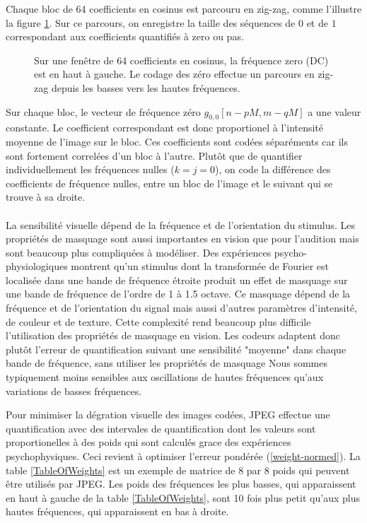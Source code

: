 Chaque bloc de 64 coefficients en cosinus est parcouru en
zig-zag, comme l'illustre la figure \ref{JPEG-zigzag}.
Sur ce parcours, on enregistre la taille des s\'equences
de $0$ et de $1$ correspondant aux coefficients quantifi\'es
\`a zero ou pas.

\begin{figure}[bhtp]
\centerline{
        \epsfxsize=5cm
	\leavevmode{}}
\caption{Sur une fen\^etre de 64 coefficients en cosinus, la
fr\'equence zero (DC) est en haut \`a gauche. Le codage des
z\'ero effectue un parcours en
zig-zag depuis les basses vers les hautes fr\'equences.}
\label{JPEG-zigzag}
\end{figure}

Sur chaque bloc,
le vecteur de fr\'equence
z\'ero $g_{0,0} [n-pM,m-qM]$ a une valeur constante.
Le coefficient correspondant est donc proportionel \`a
l'intensit\'e moyenne de l'image sur le bloc.
Ces coefficients sont cod\'ees s\'epar\'ements car
ils sont fortement
correl\'ees d'un bloc \`a l'autre. Plut\^ot que de quantifier
individuellement les
fr\'equences nulles ($k=j=0$), on code
la diff\'erence des coefficients de fr\'equence nulles,
entre un bloc de l'image
et le suivant qui se trouve \`a sa droite.
\\
\\
La sensibilit\'e visuelle d\'epend de la fr\'equence
et de l'orientation
du stimulus.
Les propri\'et\'es de masquage sont aussi importantes en vision
que pour l'audition mais sont beaucoup plus compliqu\'ees \`a mod\'eliser.
Des exp\'eriences psycho-physiologiques montrent qu'un stimulus
dont la transform\'ee de Fourier est localis\'ee dans une bande
de fr\'equence \'etroite produit un effet de masquage sur une bande
de fr\'equence de l'ordre de
1 \`a 1.5 octave. Ce masquage d\'epend de la fr\'equence et de
l'orientation du signal mais aussi d'autres param\`etres
d'intensit\'e, de couleur et de texture.
Cette complexit\'e rend beaucoup plus difficile l'utilisation
des propri\'et\'es de masquage en vision.
Les codeurs adaptent donc plut\^ot l'erreur de quantification
suivant
une sensibilit\'e "moyenne" dans chaque bande de fr\'equence,
sans utiliser les propri\'et\'es de masquage
Nous sommes typiquement moins sensibles aux oscillations de
hautes fr\'equences qu'aux variations de basses fr\'equences.

Pour minimiser la d\'egration visuelle des images cod\'ees,
JPEG effectue une quantification avec des intervales
de quantification dont les valeurs sont proportionelles
\`a des poids qui sont calcul\'es grace des exp\'eriences
psychophysiques.
Ceci revient \`a optimiser l'erreur pond\'er\'ee
(\ref{weight-normed}).
La table \ref{TableOfWeights} est un exemple de matrice
de 8 par 8 poids qui peuvent \^etre utilis\'es par
JPEG. Les poids des fr\'equences les
plus basses, qui apparaissent en haut \`a gauche de la
table \ref{TableOfWeights}, sont  10 fois plus petit qu'aux
plus hautes fr\'equences, qui apparaissent en bas \`a droite.

